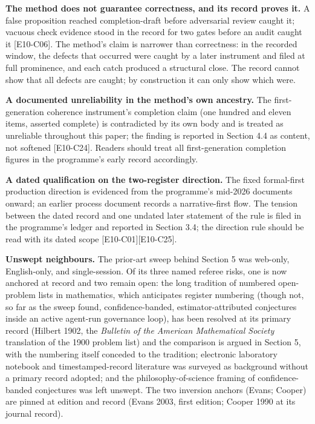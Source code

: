 \documentclass[
  11pt,
]{article}
\begin{document}
\textbf{The method does not guarantee correctness, and its record proves
it.} A false proposition reached completion-draft before adversarial
review caught it; vacuous check evidence stood in the record for two
gates before an audit caught it {[}E10-C06{]}. The method's claim is
narrower than correctness: in the recorded window, the defects that
occurred were caught by a later instrument and filed at full prominence,
and each catch produced a structural close. The record cannot show that
all defects are caught; by construction it can only show which were.

\textbf{A documented unreliability in the method's own ancestry.} The
first-generation coherence instrument's completion claim (one hundred
and eleven items, asserted complete) is contradicted by its own body and
is treated as unreliable throughout this paper; the finding is reported
in Section 4.4 as content, not softened {[}E10-C24{]}. Readers should
treat all first-generation completion figures in the programme's early
record accordingly.

\textbf{A dated qualification on the two-register direction.} The fixed
formal-first production direction is evidenced from the programme's
mid-2026 documents onward; an earlier process document records a
narrative-first flow. The tension between the dated record and one
undated later statement of the rule is filed in the programme's ledger
and reported in Section 3.4; the direction rule should be read with its
dated scope {[}E10-C01{]}{[}E10-C25{]}.

\textbf{Unswept neighbours.} The prior-art sweep behind Section 5 was
web-only, English-only, and single-session. Of its three named referee
risks, one is now anchored at record and two remain open: the long
tradition of numbered open-problem lists in mathematics, which
anticipates register numbering (though not, so far as the sweep found,
confidence-banded, estimator-attributed conjectures inside an active
agent-run governance loop), has been resolved at its primary record
(Hilbert 1902, the \emph{Bulletin of the American Mathematical Society}
translation of the 1900 problem list) and the comparison is argued in
Section 5, with the numbering itself conceded to the tradition;
electronic laboratory notebook and timestamped-record literature was
surveyed as background without a primary record adopted; and the
philosophy-of-science framing of confidence-banded conjectures was left
unswept. The two inversion anchors (Evans; Cooper) are pinned at edition
and record (Evans 2003, first edition; Cooper 1990 at its journal
record).
\end{document}

